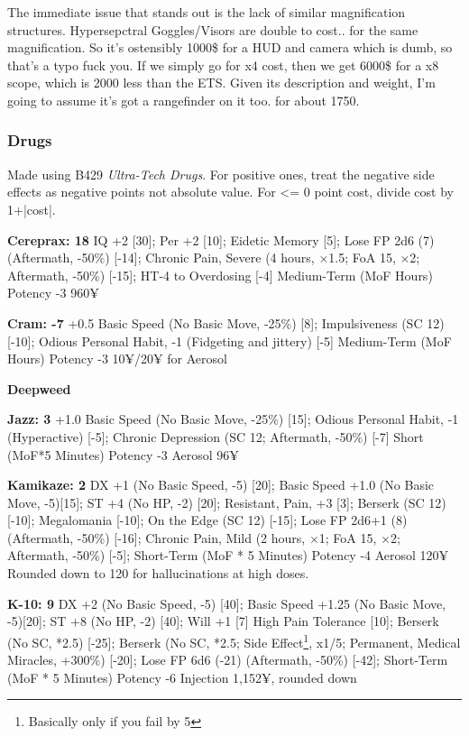 \begin{multicols*}{2}
	The immediate issue that stands out is the lack of similar magnification structures. Hypersepctral Goggles/Visors are double to cost.. for the same magnification. So it's ostensibly 1000\$ for a HUD and camera which is dumb, so that's a typo fuck you. If we simply go for x4 cost, then we get 6000\$ for a x8 scope, which is 2000 less than the ETS. Given its description and weight, I'm going to assume it's got a rangefinder on it too. for about 1750.
	
	\subsubsection{Drugs}
	
	Made using B429 \textit{Ultra-Tech Drugs}. For positive ones, treat the negative side effects as negative points not absolute value. For <= 0 point cost, divide cost by 1+|cost|.
	
	\textbf{Cereprax: 18}
	IQ +2 [30]; Per +2 [10]; Eidetic Memory [5]; Lose FP 2d6 (7) (Aftermath, -50\%) [-14]; Chronic Pain, Severe (4 hours, $\times$1.5; FoA 15, $\times$2; Aftermath, -50\%) [-15]; HT-4 to Overdosing [-4]
	Medium-Term (MoF Hours)
	Potency -3
	960¥
	
	\textbf{Cram: -7}
	+0.5 Basic Speed (No Basic Move, -25\%) [8]; Impulsiveness (SC 12) [-10]; Odious Personal Habit, -1 (Fidgeting and jittery) [-5]
	Medium-Term (MoF Hours)
	Potency -3
	10¥/20¥ for Aerosol
	
	\textbf{Deepweed}
	
	
	
	\textbf{Jazz: 3}
	+1.0 Basic Speed (No Basic Move, -25\%) [15]; Odious Personal Habit, -1 (Hyperactive) [-5]; Chronic Depression (SC 12; Aftermath, -50\%) [-7]
	Short (MoF*5 Minutes)
	Potency -3
	Aerosol
	96¥
	
	\textbf{Kamikaze: 2}
	DX +1 (No Basic Speed, -5) [20];  Basic Speed +1.0 (No Basic Move, -5)[15]; ST +4 (No HP, -2) [20]; Resistant, Pain, +3 [3]; Berserk (SC 12) [-10]; Megalomania [-10]; On the Edge (SC 12) [-15]; Lose FP 2d6+1 (8) (Aftermath, -50\%) [-16]; Chronic Pain, Mild (2 hours, $\times$1; FoA 15, $\times$2; Aftermath, -50\%) [-5];
	Short-Term (MoF * 5 Minutes)
	Potency -4
	Aerosol
	120¥
	Rounded down to 120 for hallucinations at high doses.
	
	\textbf{K-10: 9}
	DX +2 (No Basic Speed, -5) [40]; Basic Speed +1.25 (No Basic Move, -5)[20]; ST +8 (No HP, -2) [40]; Will +1 [7] High Pain Tolerance [10]; Berserk (No SC, *2.5) [-25]; Berserk (No SC, *2.5; Side Effect\footnote{Basically only if you fail by 5}, x1/5; Permanent, Medical Miracles, +300\%) [-20]; Lose FP 6d6 (-21) (Aftermath, -50\%) [-42];
	Short-Term (MoF * 5 Minutes)
	Potency -6
	Injection
	1,152¥, rounded down
	

\end{multicols*}
